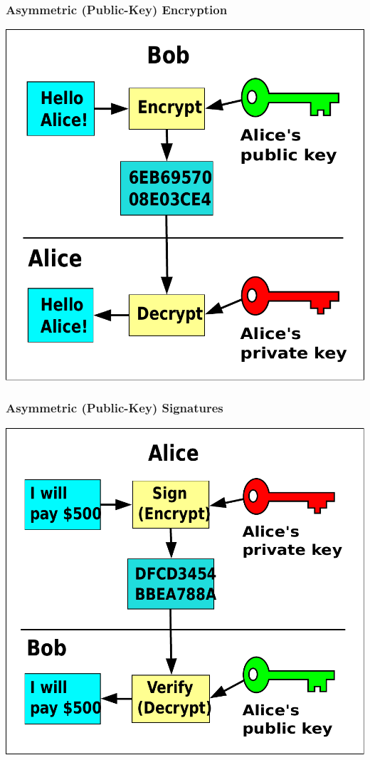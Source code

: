 \documentclass{beamer}
\begin{document}
\begin{frame}
  \frametitle{Asymmetric (Public-Key) Encryption}

\includegraphics[height=0.5\textheight]{Public_key_encryption}

\end{frame}

\begin{frame}
  \frametitle{Asymmetric (Public-Key) Signatures}

\includegraphics[height=0.5\textheight]{Public_key_signing}

\end{frame}
\end{document}
